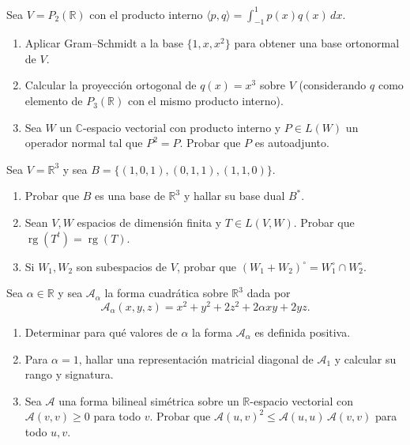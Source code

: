 \documentclass{article}
\newcommand{\R}{\mathbb{R}}
\newcommand{\C}{\mathbb{C}}
\DeclareMathOperator{\rg}{rg}
\newcommand{\ip}[2]{\langle #1, #2\rangle}
\newcommand{\A}{\mathcal{A}}
\newenvironment{ejercicio}[1]{\begin{trivlist}
\item[\hskip \labelsep {\bfseries #1.}]}{\end{trivlist}}
\begin{document}
\begin{ejercicio}{3}
    Sea \( V = P_2(\R) \) con el producto interno \( \ip{p}{q} = \int_{-1}^{1} p(x) q(x) \, dx \).
    \begin{enumerate}
        \item Aplicar Gram--Schmidt a la base \( \{1, x, x^2\} \) para obtener una base ortonormal de \( V \).
        \item Calcular la proyección ortogonal de \( q(x) = x^3 \) sobre \( V \) (considerando \( q \) como elemento de \( P_3(\R) \) con el mismo producto interno).
        \item Sea \( W \) un \( \C \)-espacio vectorial con producto interno y \( P \in L(W) \) un operador normal tal que \( P^2 = P \). Probar que \( P \) es autoadjunto.
    \end{enumerate}
\end{ejercicio}

\begin{ejercicio}{4}
    Sea \( V = \R^3 \) y sea \( B = \{(1,0,1), (0,1,1), (1,1,0)\} \).
    \begin{enumerate}
        \item Probar que \( B \) es una base de \( \R^3 \) y hallar su base dual \( B^* \).
        \item Sean \( V, W \) espacios de dimensión finita y \( T \in L(V, W) \). Probar que \( \rg(T^t) = \rg(T) \).
        \item Si \( W_1, W_2 \) son subespacios de \( V \), probar que \( (W_1 + W_2)^\circ = W_1^\circ \cap W_2^\circ \).
    \end{enumerate}
\end{ejercicio}

\begin{ejercicio}{5}
    Sea \( \alpha \in \R \) y sea \( \A_\alpha \) la forma cuadrática sobre \( \R^3 \) dada por
    \[ \A_\alpha(x, y, z) = x^2 + y^2 + 2z^2 + 2\alpha xy + 2yz. \]
    \begin{enumerate}
        \item Determinar para qué valores de \( \alpha \) la forma \( \A_\alpha \) es definida positiva.
        \item Para \( \alpha = 1 \), hallar una representación matricial diagonal de \( \A_1 \) y calcular su rango y signatura.
        \item Sea \( \A \) una forma bilineal simétrica sobre un \( \R \)-espacio vectorial con \( \A(v, v) \ge 0 \) para todo \( v \). Probar que \( \A(u, v)^2 \le \A(u, u)\,\A(v, v) \) para todo \( u, v \).
    \end{enumerate}
\end{ejercicio}
\end{document}

